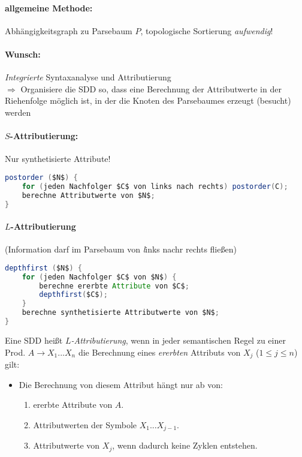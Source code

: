 \paragraph*{allgemeine Methode:} Abhängigkeitsgraph zu Parsebaum $P$, topologische Sortierung \emph{aufwendig}!
\paragraph*{Wunsch:} \emph{Integrierte} Syntaxanalyse und Attributierung\\
$\Rightarrow$ Organisiere die SDD so, dass eine Berechnung der Attributwerte in der Riehenfolge möglich ist, in der die Knoten des Parsebaumes erzeugt (besucht) werden
\paragraph*{$S$-Attributierung:} Nur synthetisierte Attribute!
\begin{lstlisting}[language=Java,mathescape=True]
postorder ($N$) {
    for (jeden Nachfolger $C$ von links nach rechts) postorder(C);
    berechne Attributwerte von $N$;
}
\end{lstlisting}

\paragraph*{$L$-Attributierung} (Information darf im Parsebaum von \emph{l}inks nachr rechts fließen)
\begin{lstlisting}[language=Java,mathescape=True]
depthfirst ($N$) {
    for (jeden Nachfolger $C$ von $N$) {
        berechne ererbte Attribute von $C$;
        depthfirst($C$);
    }
    berechne synthetisierte Attributwerte von $N$;
}
\end{lstlisting}

\Defi Eine SDD heißt \emph{$L$-Attributierung}, wenn in jeder semantischen Regel zu einer Prod. $A \to X_1...X_n$ die Berechnung eines \emph{ererbten} Attributs von $X_j$ ($1 \leq j \leq n$) gilt:
\begin{itemize}
\item   Die Berechnung von diesem Attribut hängt nur ab von:
        \begin{enumerate}
        \item   ererbte Attribute von $A$.
        \item   Attributwerten der Symbole $X_1...X_{j-1}$.
        \item   Attributwerte von $X_j$, wenn dadurch keine Zyklen entstehen.
        \end{enumerate}
\end{itemize}

